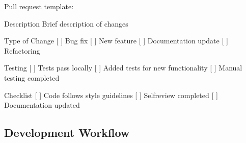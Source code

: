 \documentclass[letterpaper,10pt,english]{sphinxmanual}
\begin{document}
\sphinxAtStartPar
Pull request template:

\begin{sphinxVerbatim}[commandchars=\\\{\}]
\PYGZsh{}\PYGZsh{} Description
Brief description of changes

\PYGZsh{}\PYGZsh{} Type of Change
\PYGZhy{} [ ] Bug fix
\PYGZhy{} [ ] New feature
\PYGZhy{} [ ] Documentation update
\PYGZhy{} [ ] Refactoring

\PYGZsh{}\PYGZsh{} Testing
\PYGZhy{} [ ] Tests pass locally
\PYGZhy{} [ ] Added tests for new functionality
\PYGZhy{} [ ] Manual testing completed

\PYGZsh{}\PYGZsh{} Checklist
\PYGZhy{} [ ] Code follows style guidelines
\PYGZhy{} [ ] Self\PYGZhy{}review completed
\PYGZhy{} [ ] Documentation updated
\end{sphinxVerbatim}


\subsection{Development Workflow}
\label{\detokenize{developer/contributing:development-workflow}}
\end{document}
